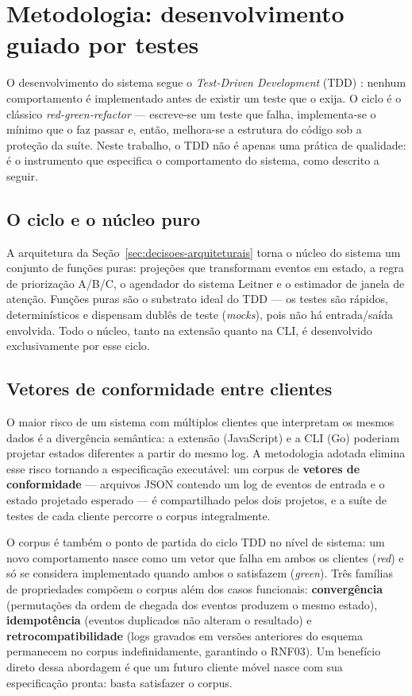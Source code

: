 \documentclass[12pt, %
openright, 
oneside,
a4paper,
english,   %
brazil]{facom-ufu-abntex2}
\begin{document}
\section{Metodologia: desenvolvimento guiado por testes}
\label{sec:metodologia-tdd}

O desenvolvimento do sistema segue o \textit{Test-Driven Development} (TDD)
\cite{BeckTDD}: nenhum comportamento é implementado antes de existir um teste
que o exija. O ciclo é o clássico \textit{red-green-refactor} --- escreve-se
um teste que falha, implementa-se o mínimo que o faz passar e, então,
melhora-se a estrutura do código sob a proteção da suíte. Neste trabalho, o
TDD não é apenas uma prática de qualidade: é o instrumento que especifica o
comportamento do sistema, como descrito a seguir.

\subsection{O ciclo e o núcleo puro}

A arquitetura da Seção~\ref{sec:decisoes-arquiteturais} torna o núcleo do
sistema um conjunto de funções puras: projeções que transformam eventos em
estado, a regra de priorização A/B/C, o agendador do sistema Leitner e o
estimador de janela de atenção. Funções puras são o substrato ideal do TDD ---
os testes são rápidos, determinísticos e dispensam dublês de teste
(\textit{mocks}), pois não há entrada/saída envolvida. Todo o núcleo, tanto na
extensão quanto na CLI, é desenvolvido exclusivamente por esse ciclo.

\subsection{Vetores de conformidade entre clientes}

O maior risco de um sistema com múltiplos clientes que interpretam os mesmos
dados é a divergência semântica: a extensão (JavaScript) e a CLI (Go) poderiam
projetar estados diferentes a partir do mesmo log. A metodologia adotada
elimina esse risco tornando a especificação executável: um corpus de
\textbf{vetores de conformidade} --- arquivos JSON contendo um log de eventos
de entrada e o estado projetado esperado --- é compartilhado pelos dois
projetos, e a suíte de testes de cada cliente percorre o corpus integralmente.

O corpus é também o ponto de partida do ciclo TDD no nível de sistema: um novo
comportamento nasce como um vetor que falha em ambos os clientes
(\textit{red}) e só se considera implementado quando ambos o satisfazem
(\textit{green}). Três famílias de propriedades compõem o corpus além dos
casos funcionais: \textbf{convergência} (permutações da ordem de chegada dos
eventos produzem o mesmo estado), \textbf{idempotência} (eventos duplicados
não alteram o resultado) e \textbf{retrocompatibilidade} (logs gravados em
versões anteriores do esquema permanecem no corpus indefinidamente, garantindo
o RNF03). Um benefício direto dessa abordagem é que um futuro cliente móvel
nasce com sua especificação pronta: basta satisfazer o corpus.
\end{document}
